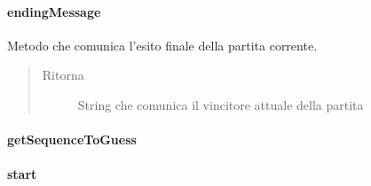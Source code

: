 \documentclass[letterpaper,10pt,italian,openany,oneside]{sphinxmanual}
\begin{document}
\paragraph{endingMessage}
\label{\detokenize{source/it/unicam/cs/pa/mastermind/gamecore/SingleMatch:endingmessage}}

\begin{fulllineitems}
\label{\detokenize{source/it/unicam/cs/pa/mastermind/gamecore/SingleMatch:it.unicam.cs.pa.mastermind.gamecore.SingleMatch.endingMessage()}}
Metodo che comunica l’esito finale della partita corrente.
\begin{quote}\begin{description}
\item[{Ritorna}] \leavevmode
String che comunica il vincitore attuale della partita

\end{description}\end{quote}

\end{fulllineitems}



\paragraph{getSequenceToGuess}
\label{\detokenize{source/it/unicam/cs/pa/mastermind/gamecore/SingleMatch:getsequencetoguess}}

\begin{fulllineitems}
\label{\detokenize{source/it/unicam/cs/pa/mastermind/gamecore/SingleMatch:it.unicam.cs.pa.mastermind.gamecore.SingleMatch.getSequenceToGuess()}}
\end{fulllineitems}



\paragraph{start}
\label{\detokenize{source/it/unicam/cs/pa/mastermind/gamecore/SingleMatch:start}}
\end{document}
